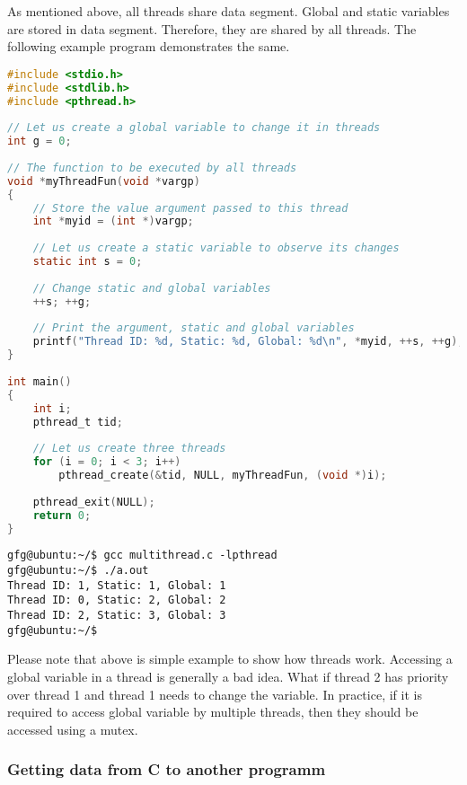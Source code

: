 As mentioned above, all threads share data segment. Global and static variables are stored in data segment. Therefore, they are shared by all threads. The following example program demonstrates the same.

\begin{lstlisting}[language=c]
#include <stdio.h>
#include <stdlib.h>
#include <pthread.h>
 
// Let us create a global variable to change it in threads
int g = 0;
 
// The function to be executed by all threads
void *myThreadFun(void *vargp)
{
    // Store the value argument passed to this thread
    int *myid = (int *)vargp;
 
    // Let us create a static variable to observe its changes
    static int s = 0;
 
    // Change static and global variables
    ++s; ++g;
 
    // Print the argument, static and global variables
    printf("Thread ID: %d, Static: %d, Global: %d\n", *myid, ++s, ++g);
}
 
int main()
{
    int i;
    pthread_t tid;
 
    // Let us create three threads
    for (i = 0; i < 3; i++)
        pthread_create(&tid, NULL, myThreadFun, (void *)i);
 
    pthread_exit(NULL);
    return 0;
}
\end{lstlisting}

\begin{lstlisting}
gfg@ubuntu:~/$ gcc multithread.c -lpthread
gfg@ubuntu:~/$ ./a.out
Thread ID: 1, Static: 1, Global: 1
Thread ID: 0, Static: 2, Global: 2
Thread ID: 2, Static: 3, Global: 3
gfg@ubuntu:~/$ 
\end{lstlisting}

Please note that above is simple example to show how threads work. Accessing a global variable in a thread is generally a bad idea. What if thread 2 has priority over thread 1 and thread 1 needs to change the variable. In practice, if it is required to access global variable by multiple threads, then they should be accessed using a mutex.

\subsubsection{Getting data from C to another programm}


